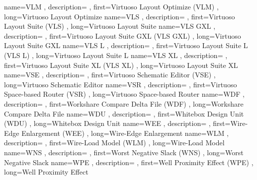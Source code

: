 { name={VLM}
, description={}
, first={Virtuoso Layout Optimize (VLM)}
, long={Virtuoso Layout Optimize}
}
{ name={VLS}
, description={}
, first={Virtuoso Layout Suite (VLS)}
, long={Virtuoso Layout Suite}
}
{ name={VLS GXL}
, description={}
, first={Virtuoso Layout Suite GXL (VLS GXL)}
, long={Virtuoso Layout Suite GXL}
}
{ name={VLS L}
, description={}
, first={Virtuoso Layout Suite L (VLS L)}
, long={Virtuoso Layout Suite L}
}
{ name={VLS XL}
, description={}
, first={Virtuoso Layout Suite XL (VLS XL)}
, long={Virtuoso Layout Suite XL}
}
{ name={VSE}
, description={}
, first={Virtuoso Schematic Editor (VSE)}
, long={Virtuoso Schematic Editor}
}
{ name={VSR}
, description={}
, first={Virtuoso Space-based Router (VSR)}
, long={Virtuoso Space-based Router}
}
{ name={WDF}
, description={}
, first={Workshare Compare Delta File (WDF)}
, long={Workshare Compare Delta File}
}
{ name={WDU}
, description={}
, first={Whitebox Design Unit (WDU)}
, long={Whitebox Design Unit}
}
{ name={WEE}
, description={}
, first={Wire-Edge Enlargement (WEE)}
, long={Wire-Edge Enlargement}
}
{ name={WLM}
, description={}
, first={Wire-Load Model (WLM)}
, long={Wire-Load Model}
}
{ name={WNS}
, description={}
, first={Worst Negative Slack (WNS)}
, long={Worst Negative Slack}
}
{ name={WPE}
, description={}
, first={Well Proximity Effect (WPE)}
, long={Well Proximity Effect}
}
